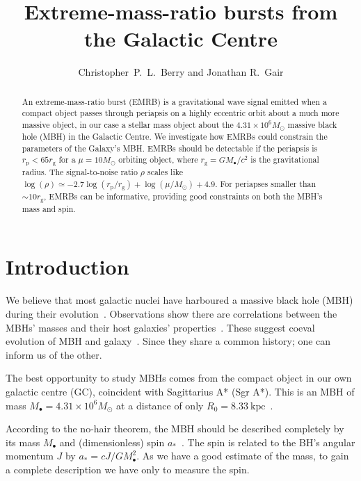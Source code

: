 \documentclass[11pt,twoside]{article}
\begin{document}
\resetcounters

\title{Extreme-mass-ratio bursts from the Galactic Centre}
 \author{Christopher~P.~L.~Berry and Jonathan R.\ Gair }
 
\begin{abstract} 
An extreme-mass-ratio burst (EMRB) is a gravitational wave signal emitted when a compact object passes through periapsis on a highly eccentric orbit about a much more massive object, in our case a stellar mass object about the $4.31 \times 10^6 M_\odot$ massive black hole (MBH) in the Galactic Centre. We investigate how EMRBs could constrain the parameters of the Galaxy's MBH. EMRBs should be detectable if the periapsis is $r_\mathrm{p} < 65 r_\mathrm{g}$ for a $\mu = 10 M_\odot$ orbiting object, where $r_\mathrm{g} = GM_\bullet/c^2$ is the gravitational radius. The signal-to-noise ratio $\rho$ scales like $\log(\rho) \simeq -2.7\log(r_\mathrm{p}/r_\mathrm{g}) + \log(\mu/M_\odot) + 4.9$. For periapses smaller than $\sim 10 r_\mathrm{g}$, EMRBs can be informative, providing good constraints on both the MBH's mass and spin.
\end{abstract}

\section{Introduction} 

We believe that most galactic nuclei have harboured a massive black hole (MBH) during their evolution~\citep{Lynden-Bell1971, Rees1984}. Observations show there are correlations between the MBHs' masses and their host galaxies' properties~\citep{Kormendy1995, Magorrian1998, Graham2011}. These suggest coeval evolution of MBH and galaxy~\citep{Peng2007, Jahnke2011}. Since they share a common history; one can inform us of the other.

The best opportunity to study MBHs comes from the compact object in our own galactic centre (GC), coincident with Sagittarius A* (Sgr A*). This is an MBH of mass $M_\bullet = 4.31 \times 10^6 M_\odot$ at a distance of only $R_0 = 8.33~\mathrm{kpc}$~\citep{Gillessen2009}.

According to the no-hair theorem, the MBH should be described completely by its mass $M_\bullet$ and (dimensionless) spin $a_\ast$~\citep{Chandrasekhar1998}. The spin is related to the BH's angular momentum $J$ by $a_\ast = cJ/GM_\bullet^2$. As we have a good estimate of the mass, to gain a complete description we have only to measure the spin.
\end{document}
